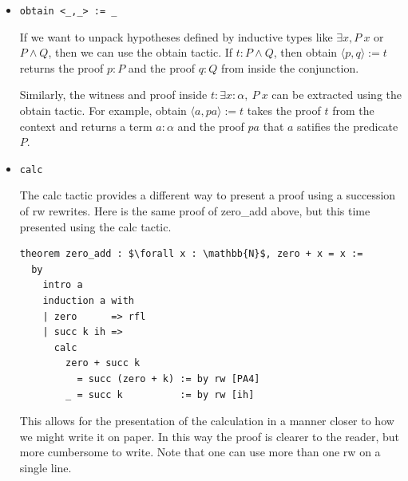 \documentclass[12pt]{article}
\begin{document}
\begin{itemize}
\begin{itemize}
\begin{lstlisting}[language=Lean]
theorem zero_add :$\forall x : \mathbb{N}$, zero + x = x :=
  by
    intro a
    induction a with
    | zero      => rfl
    | succ k ih => rw [add_succ,ih]
\end{lstlisting}

This requires the proof of the base cases i.e. the case $a = $ zero and the induction step where $a = $ succ $k$ for some natural number $k$. In the induction step we have access to the proof of the theorem at $a = k$; here we have called that proof ih - induction hypothesis.

\newpage
\item \texttt{obtain <\_,\_> := \_}

If we want to unpack hypotheses defined by inductive types like $\exists x, P \ x$ or $P \land Q$, then we can use the obtain tactic. If $t : P \land Q$, then obtain $\langle p,q\rangle := t$ returns the proof $p : P$ and the proof $q : Q$ from inside the conjunction.

Similarly, the witness and proof inside $t : \exists x : \alpha, \ P \ x$ can be extracted using the obtain tactic. For example, obtain $\langle a,pa\rangle := t$ takes the proof $t$ from the context and returns a term $a : \alpha$ and the proof $pa$ that $a$ satifies the predicate $P$.

\item \texttt{calc}

The calc tactic provides a different way to present a proof using a succession of rw rewrites. Here is the same proof of zero\_add above, but this time presented using the calc tactic. 

\begin{lstlisting}[language=Lean]
theorem zero_add : $\forall x : \mathbb{N}$, zero + x = x :=
  by
    intro a
    induction a with
    | zero      => rfl
    | succ k ih =>
      calc
        zero + succ k
          = succ (zero + k) := by rw [PA4]
        _ = succ k          := by rw [ih]
\end{lstlisting}

This allows for the presentation of the calculation in a manner closer to how we might write it on paper. In this way the proof is clearer to the reader, but more cumbersome to write. Note that one can use more than one rw on a single line. 

\end{itemize}  
\end{itemize}
\end{document}
